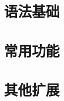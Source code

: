 \documentclass[10pt,a4paper]{report}
\begin{document}
	\part{语法基础}
		

		

		

		

		

		

	\part{常用功能}
		

	\part{其他扩展}
\end{document}
